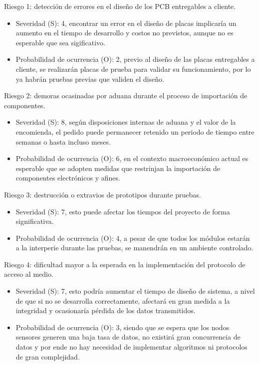 \documentclass[
11pt, %
codirector, %
]{charter}
\begin{document}
Riesgo 1: detección de errores en el diseño de los PCB entregables a cliente.
\begin{itemize}
	\item Severidad (S): 4, encontrar un error en el diseño de placas implicaría un aumento en el tiempo de desarrollo y costos no previstos, aunque no es esperable que sea sigificativo.
	\item Probabilidad de ocurrencia (O): 2, previo al diseño de las placas entregables a cliente, se realizarán placas de prueba para validar su funcionamiento, por lo ya habrán pruebas previas que validen el diseño.
\end{itemize}   

Riesgo 2: demoras ocasinadas por aduana durante el proceso de importación de componentes.
\begin{itemize}
	\item Severidad (S): 8, según disposiciones internas de aduana y el valor de la encomienda, el pedido puede permanecer retenido un periodo de tiempo entre semanas o hasta incluso meses.
	\item Probabilidad de ocurrencia (O): 6, en el contexto macroeconómico actual es esperable que se adopten medidas que restrinjan la importación de componentes electrónicos y afines.
\end{itemize}

Riesgo 3: destrucción o extravios de prototipos durante pruebas.
\begin{itemize}
	\item Severidad (S): 7, esto puede afectar los tiempos del proyecto de forma significativa.
	\item Probabilidad de ocurrencia (O): 4, a pesar de que todos los módulos estarán a la interperie durante las pruebas, se manendrán en un ambiente controlado.
\end{itemize}

Riesgo 4: dificultad mayor a la esperada en la implementación del protocolo de acceso al medio.
\begin{itemize}
	\item Severidad (S): 7, esto podría aumentar el tiempo de diseño de sistema, a nivel de que si no se desarrolla correctamente, afectará en gran medida a la integridad y ocasionaría pérdida de los datos transmitidos.
	\item Probabilidad de ocurrencia (O): 3, siendo que se espera que los nodos sensores generen una baja tasa de datos, no existirá gran concurrencia de datos y por ende no hay necesidad de implementar algoritmos ni protocolos de gran complejidad.
\end{itemize}
\end{document}
